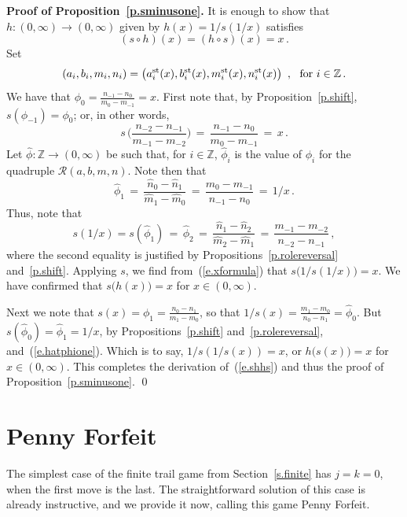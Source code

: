 \documentclass[letterpaper,11pt,oneside,reqno]{amsbook}
\newcommand{\Z}{\ensuremath{\mathbb{Z}}}
\numberwithin{figure}{chapter}
\theoremstyle{definition}
\theoremstyle{definition}
\theoremstyle{definition}
\theoremstyle{definition}
\theoremstyle{definition}
\newcommand{\mc}{\mathcal}
\newcommand{\asta}{a^{\rm st}}
\newcommand{\bst}{b^{\rm st}}
\newcommand{\mst}{m^{\rm st}}
\newcommand{\nst}{n^{\rm st}}
\newcommand{\abmnmacspace}{\textrm{ABMN} }
\begin{document}
 {\bf Proof of Proposition~\ref{p.sminusone}.}
 It is enough to show that $h:(0,\infty) \to (0,\infty)$ given by $h(x) = 1/s(1/x)$ satisfies
 \begin{equation}\label{e.shhs}
  (s \circ h)(x) = (h \circ s)(x) = x \, .
 \end{equation}
  Set
 $$
 (a_i,b_i,m_i,n_i) = \big( \asta_i(x), \bst_i(x),\mst_i(x),\nst_i(x) \big) \, \, \, , \, \, \, \, \textrm{for $i \in \Z$} \, .
 $$
 We have that $\phi_0 = \tfrac{n_{-1}-n_0}{m_0 - m_{-1}} = x$.
 First note that, by Proposition~\ref{p.shift}, $s(\phi_{-1}) = \phi_0$; or, in other words,
 \begin{equation}\label{e.xformula}
  s \, \bigg( \frac{n_{-2} - n_{-1}}{m_{-1} - m_{-2}} \bigg)  \, = \, \frac{n_{-1} - n_0}{m_0 - m_{-1}} \, = \, x \, .
 \end{equation}
 Let $\hat{\phi}:\Z \to (0,\infty)$ be such that, for $i \in \Z$, $\hat\phi_i$ is the value of $\phi_i$ for the quadruple $\mc{R}(a,b,m,n)$. Note then that
 \begin{equation}\label{e.hatphione}
 \hat\phi_1 \,  =\,  \frac{\hat{n}_0 - \hat{n}_1}{\hat{m}_1 - \hat{m}_0} \, =\,  \frac{m_0 - m_{-1}}{n_{-1} - n_0} \, = \, 1/x \, . 
 \end{equation}
Thus,  note that 
 $$
 s(1/x) =   s(\hat\phi_1) \, = \, \hat\phi_2 \, = \, \frac{\hat{n}_1 - \hat{n}_2}{\hat{m}_2 - \hat{m}_1} \, =\,  \frac{m_{-1} - m_{-2}}{n_{-2} - n_{-1}} \, , 
 $$
where the second equality is justified by 
Propositions~\ref{p.rolereversal} and~\ref{p.shift}. Applying $s$, we find from~(\ref{e.xformula}) that 
$s\big(1/s(1/x) \big) = x$.
We have confirmed that $s\big(h(x)\big) = x$ for $x \in (0,\infty)$.
 
 Next we note that $s(x) = \phi_1 = \tfrac{n_0 - n_1}{m_1 - m_0}$, so that $1/s(x) = \tfrac{m_1 - m_0}{n_0 - n_1} = \hat\phi_0$. But $s(\hat\phi_0) = \hat\phi_1 = 1/x$, by Propositions~\ref{p.shift} and~\ref{p.rolereversal}, and~(\ref{e.hatphione}). Which is to say, $1/s(1/s(x)) = x$, or $h\big(s(x)\big) = x$ for $x \in (0,\infty)$. This completes the derivation of~(\ref{e.shhs}) and thus the proof of Proposition~\ref{p.sminusone}.
 \qed


\section{Penny Forfeit}\label{s.pennyforfeit}
 The simplest case of the finite trail game from Section~\ref{s.finite} has $j=k=0$, when the first move is the last. 
The straightforward solution of this case is already instructive, and we provide it now, calling this game Penny Forfeit.  
\end{document}
